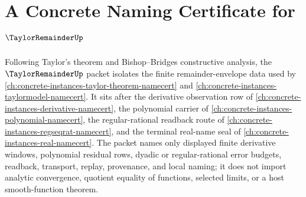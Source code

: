 \chapter{A Concrete Naming Certificate for $\TaylorRemainderUp$}
\label{ch:concrete-instances-taylor-remainder-namecert}

Following Taylor's theorem and Bishop--Bridges constructive analysis, the $\TaylorRemainderUp$ packet isolates the finite remainder-envelope data used by \autoref{ch:concrete-instances-taylor-theorem-namecert} and \autoref{ch:concrete-instances-taylormodel-namecert}. It sits after the derivative observation row of \autoref{ch:concrete-instances-derivative-namecert}, the polynomial carrier of \autoref{ch:concrete-instances-polynomial-namecert}, the regular-rational readback route of \autoref{ch:concrete-instances-regseqrat-namecert}, and the terminal real-name seal of \autoref{ch:concrete-instances-real-namecert}. The packet names only displayed finite derivative windows, polynomial residual rows, dyadic or regular-rational error budgets, readback, transport, replay, provenance, and local naming; it does not import analytic convergence, quotient equality of functions, selected limits, or a host smooth-function theorem.

